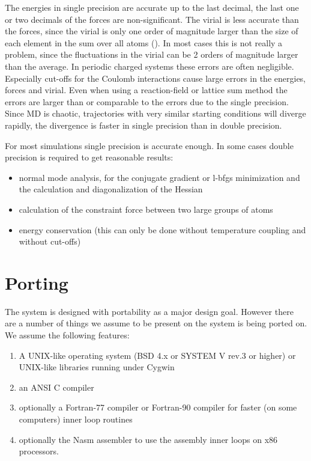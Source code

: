 The energies in single precision are accurate up to the last decimal,
the last one or two decimals of the forces are non-significant.
The virial is less accurate than the forces, since the virial is only one
order of magnitude larger than the size of each element in the sum over
all atoms ().
In most cases this is not really a problem, since the fluctuations in the
virial can be 2 orders of magnitude larger than the average.
In periodic charged systems these errors are often negligible.
Especially cut-offs for the Coulomb interactions cause large errors
in the energies, forces and virial.
Even when using a reaction-field or lattice sum method the errors
are larger than or comparable to the errors due to the single precision.
Since MD is chaotic, trajectories with very similar starting conditions will
diverge rapidly, the divergence is faster in single precision than in double
precision.

For most simulations single precision is accurate enough.
In some cases double precision is required to get reasonable results:
\begin{itemize}
\item normal mode analysis,
for the conjugate gradient or l-bfgs minimization and the calculation and
diagonalization of the Hessian
\item calculation of the constraint force between two large groups of atoms
\item energy conservation (this can only be done without temperature coupling
and without cut-offs)
\end{itemize}

\section{Porting {\gromacs}}
The {\gromacs} system is designed with portability as a major design
goal. However there are a number of things we assume to be present on
the system {\gromacs} is being ported on. We assume the following
features:

\begin{enumerate}
\item   A UNIX-like operating system (BSD 4.x or SYSTEM V rev.3 or higher) 
        or UNIX-like libraries running under {\eg} Cygwin
\item   an ANSI C compiler 
\item   optionally a Fortran-77 compiler or Fortran-90 compiler
        for faster (on some computers) inner loop routines
\item   optionally the Nasm assembler to use the assembly inner loops
        on x86 processors.
\end{enumerate}

